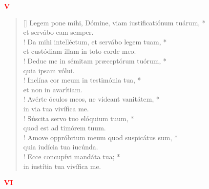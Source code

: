


\def\greinitialformat#1{%
{\fontsize{39}{39}\selectfont #1}%
}




\vspace{0.3cm}
\begin{center}
 \textcolor{red}{ \bf V}\\
\end{center}
\begin{verse}[\versewidth]
Legem pone mihi, Dómine, viam iustificatiónum tuárum, *\\
et servábo eam semper.\\!
\vin Da mihi intelléctum, et servábo legem tuam, *\\
\vin et custódiam illam in toto corde meo.\\!
Deduc me in sémitam præceptórum tuórum, *\\
quia ipsam vólui.\\!
\vin Inclína cor meum in testimónia tua, *\\
\vin et non in avarítiam.\\!
Avérte óculos meos, ne vídeant vanitátem, *\\
in via tua vivífica me.\\!
\vin Súscita servo tuo elóquium tuum, *\\
\vin quod est ad timórem tuum.\\!
Amove oppróbrium meum quod suspicátus sum, *\\
quia iudícia tua iucúnda.\\!
\vin Ecce concupívi mandáta tua; *\\
\vin in iustítia tua vivífica me.\\
\end{verse}
\begin{center}
\textcolor{red}{\bf VI}\\
\end{center}
